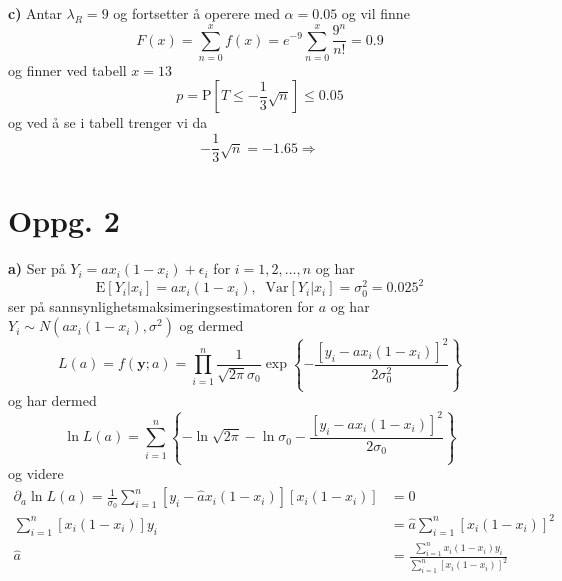 \documentclass{report}
\newcommand{\bbrack}[1]{\left[ #1 \right]}
\newcommand{\cbrack}[1]{\left\lbrace #1 \right\rbrace}
\newcommand{\Var}[1]{\text{Var} \bbrack{ #1 }}
\newcommand{\fvv}[1]{\text{E} \bbrack{ #1 }}
\newcommand{\Prob}[1]{\text{P} \bbrack{ #1 }}
\begin{document}
\textbf{c)}
Antar $\lambda_{R} = 9$ og fortsetter å operere med $\alpha = 0.05$ og vil finne
\begin{equation}
  \label{eq:13}
  F(x) = \sum_{n=0}^{x} f(x) = e^{-9} \sum_{n=0}^{x} \frac{9^{n}}{n!} = 0.9
\end{equation}
og finner ved tabell $x = 13$
\begin{equation}
  \label{eq:11}
  p = \Prob{ T \leq -\frac{1}{3}\sqrt{n} } \leq 0.05
\end{equation}
og ved å se i tabell trenger vi da
\begin{equation}
  \label{eq:12}
  -\frac{1}{3}\sqrt{n} = -1.65 \Rightarrow
\end{equation}



\section*{Oppg. 2}
\textbf{a)}
Ser på $Y_{i} = ax_{i}(1-x_{i}) + \epsilon_{i}$ for $i = 1, 2, \dots, n$ og har
\begin{equation}
  \label{eq:14}
  \fvv{ Y_{i} | x_{i} } = ax_{i} (1-x_{i}), \;\; \Var{ Y_{i} | x_{i} } = \sigma_{0}^{2} = 0.025^{2}
\end{equation}
ser på sannsynlighetsmaksimeringsestimatoren for $a$ og har $Y_{i} \sim N(ax_{i} (1-x_{i}), \sigma^{2})$ og dermed
\begin{equation}
  \label{eq:15}
  L(a) = f(\mathbf{y};a) = \prod_{i=1}^{n} \frac{1}{\sqrt{2\pi}\sigma_{0}} \exp\cbrack{ -\frac{ \bbrack{ y_{i} - ax_{i} (1-x_{i}) }^{2} }{ 2\sigma_{0}^{2} } }
\end{equation}
og har dermed
\begin{equation}
  \label{eq:10}
  \ln L(a) = \sum_{i=1}^{n} \cbrack{ -\ln \sqrt{2\pi} - \ln \sigma_{0} - \frac{\bbrack{ y_{i} - ax_{i}(1-x_{i}) }^{2}}{2\sigma_{0}} }
\end{equation}
og videre
\begin{equation}
  \label{eq:16}
  \begin{split}
    \partial_{a}\ln L(a) = \frac{1}{\sigma_{0}}\sum_{i=1}^{n} \bbrack{ y_{i} - \hat{a}x_{i}(1-x_{i}) } \bbrack{x_{i}(1-x_{i})} &= 0 \\
    \sum_{i=1}^{n}\bbrack{x_{i}(1-x_{i})}y_{i} &= \hat{a}\sum_{i=1}^{n} \bbrack{ x_{i} (1-x_{i}) }^{2} \\
    \hat{a} &= \frac{\sum_{i=1}^{n} x_{i}(1 - x_{i})y_{i} }{ \sum_{i=1}^{n} \bbrack{ x_{i} (1-x_{i}) }^{2} }
  \end{split}
\end{equation}
\end{document}
